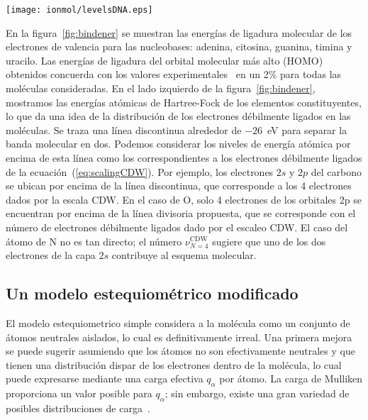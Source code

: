 \begin{figure*}[t]
\centering
\texttt{[image: ionmol/levelsDNA.eps]}
\caption[Energías de ligadura moleculares teóricas de ADN y ARN.]
{Energías de ligadura moleculares teóricas de adenina, citosina, guanina, 
timina, y uracilo, comparado con los valores correspondientes de los 
átomos que las constituyen.}
\label{fig:bindener}
\end{figure*}

En la figura~\ref{fig:bindener} se muestran las energías de ligadura 
molecular de los electrones de valencia para las nucleobases: adenina, 
citosina, guanina, timina y uracilo. Las energías de ligadura del orbital 
molecular más alto (HOMO) obtenidos concuerda con los valores
experimentales~\cite{Hush,Verkin,Dougherty} en un 2\% para todas las 
moléculas consideradas. En el lado izquierdo de la figura~\ref{fig:bindener}, 
mostramos las energías atómicas de Hartree-Fock de los elementos 
constituyentes, lo que da una idea de la distribución de los electrones
débilmente ligados en las moléculas. Se traza una línea discontinua 
alrededor de $-26$~eV para separar la banda molecular en dos. Podemos 
considerar los niveles de energía atómica por encima de esta línea como 
los correspondientes a los electrones débilmente ligados de la 
ecuación~(\ref{eq:scalingCDW}). Por ejemplo, los electrones $2s$ y $2p$ 
del carbono se ubican por encima de la línea discontinua, que corresponde 
a los 4 electrones dados por la escala CDW. En el caso de O, solo 4 
electrones de los orbitales 2p se encuentran por encima de la línea 
divisoria propuesta, que se corresponde con el número de electrones
débilmente ligados dado por el escaleo CDW. El caso del átomo de N no 
es tan directo; el número $\nu_{N=4}^{\text{CDW}}$ sugiere que uno de 
los dos electrones de la capa $2s$ contribuye al esquema molecular.

\subsection{Un modelo estequiométrico modificado}

El modelo estequiometrico simple considera a la molécula como un 
conjunto de átomos neutrales aislados, lo cual es definitivamente irreal.
Una primera mejora se puede sugerir asumiendo que los átomos no son
efectivamente neutrales y que tienen una distribución dispar de los 
electrones dentro de la molécula, lo cual puede expresarse mediante una
carga efectiva $q_{\alpha}$ por átomo. La carga de Mulliken proporciona
un valor posible para $q_{\alpha}$; sin embargo, existe una gran variedad
de posibles distribuciones de carga~\cite{lee2003}.


